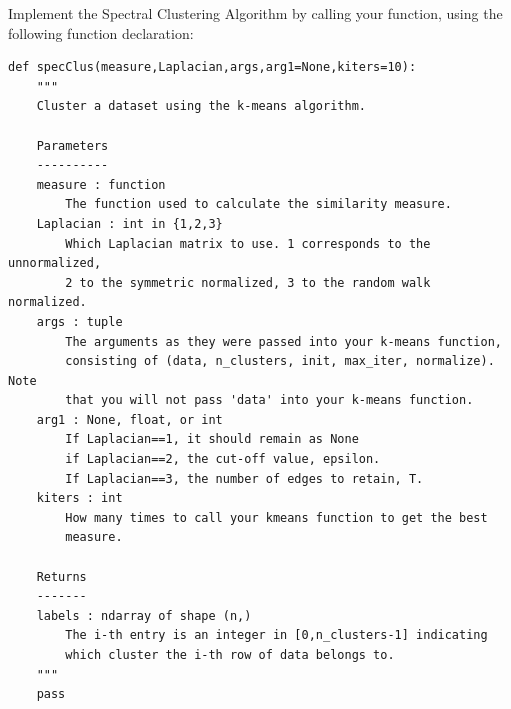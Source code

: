 \begin{problem}
Implement the Spectral Clustering Algorithm by calling your  function, using the following function declaration:
\begin{lstlisting}
def specClus(measure,Laplacian,args,arg1=None,kiters=10):
    """
    Cluster a dataset using the k-means algorithm.

    Parameters
    ----------
    measure : function
        The function used to calculate the similarity measure.
    Laplacian : int in {1,2,3}
        Which Laplacian matrix to use. 1 corresponds to the unnormalized,
        2 to the symmetric normalized, 3 to the random walk normalized.
    args : tuple
        The arguments as they were passed into your k-means function,
        consisting of (data, n_clusters, init, max_iter, normalize). Note
        that you will not pass 'data' into your k-means function.
    arg1 : None, float, or int
        If Laplacian==1, it should remain as None
        if Laplacian==2, the cut-off value, epsilon.
        If Laplacian==3, the number of edges to retain, T.
    kiters : int
        How many times to call your kmeans function to get the best
        measure.

    Returns
    -------
    labels : ndarray of shape (n,)
        The i-th entry is an integer in [0,n_clusters-1] indicating
        which cluster the i-th row of data belongs to.
    """
    pass
\end{lstlisting}
\end{problem}

